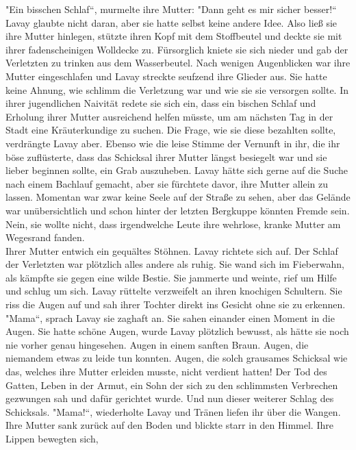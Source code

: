 "Ein bisschen Schlaf``, murmelte ihre Mutter: "Dann geht es mir sicher besser!``\\
Lavay glaubte nicht daran, aber sie hatte selbst keine andere Idee. Also ließ sie ihre Mutter 
hinlegen, stützte ihren Kopf mit dem Stoffbeutel und deckte sie mit ihrer fadenscheinigen Wolldecke 
zu. Fürsorglich kniete sie sich nieder und gab der Verletzten zu trinken aus dem Wasserbeutel. Nach 
wenigen Augenblicken war ihre Mutter eingeschlafen und Lavay streckte seufzend ihre Glieder aus. 
Sie hatte keine Ahnung, wie schlimm die Verletzung war und wie sie sie versorgen sollte. In ihrer 
jugendlichen Naivität redete sie sich ein, dass ein bischen Schlaf und Erholung ihrer Mutter 
ausreichend helfen müsste, um am nächsten Tag in der Stadt eine Kräuterkundige zu suchen. Die 
Frage, wie sie diese bezahlten sollte, verdrängte Lavay aber. Ebenso wie die leise Stimme der 
Vernunft in ihr, die ihr böse zuflüsterte, dass das Schicksal ihrer Mutter längst besiegelt war und 
sie lieber beginnen sollte, ein Grab auszuheben. Lavay hätte sich gerne auf die Suche nach einem 
Bachlauf gemacht, aber sie fürchtete davor, ihre Mutter allein zu lassen. Momentan war zwar keine 
Seele auf der Straße zu sehen, aber das Gelände war unübersichtlich und schon hinter der letzten 
Bergkuppe könnten Fremde sein. Nein, sie wollte nicht, dass irgendwelche Leute ihre wehrlose, 
kranke Mutter am Wegesrand fanden.\\
Ihrer Mutter entwich ein gequältes Stöhnen. Lavay richtete sich auf. Der Schlaf der Verletzten war 
plötzlich alles andere als ruhig. Sie wand sich im Fieberwahn, als kämpfte sie gegen eine wilde 
Bestie. Sie jammerte und weinte, rief um Hilfe und schlug um sich. Lavay rüttelte verzweifelt an 
ihren knochigen Schultern. Sie riss die Augen auf und sah ihrer Tochter direkt ins Gesicht ohne sie 
zu erkennen.\\
"Mama``, sprach Lavay sie zaghaft an. Sie sahen einander einen Moment in die Augen. Sie hatte 
schöne Augen, wurde Lavay plötzlich bewusst, als hätte sie noch nie vorher genau hingesehen. Augen 
in einem sanften Braun. Augen, die niemandem etwas zu leide tun konnten. Augen, die solch grausames 
Schicksal wie das, welches ihre Mutter erleiden musste, nicht verdient hatten! Der Tod des Gatten, 
Leben in der Armut, ein Sohn der sich zu den schlimmsten Verbrechen gezwungen sah und dafür 
gerichtet wurde. Und nun dieser weiterer Schlag des Schicksals. "Mama!``, wiederholte Lavay und 
Tränen liefen ihr über die Wangen.\\
Ihre Mutter sank zurück auf den Boden und blickte starr in den Himmel. Ihre Lippen bewegten sich, 
